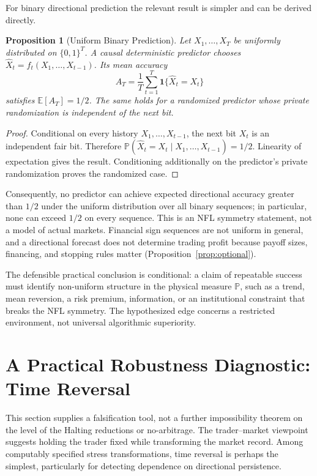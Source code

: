 \documentclass[aps,pra,reprint,superscriptaddress,amsmath,amssymb,floatfix]{revtex4-2}
\theoremstyle{plain}
\newtheorem{proposition}[theorem]{Proposition}
\theoremstyle{definition}
\theoremstyle{remark}
\begin{document}
For binary directional prediction the relevant result is simpler and can be
derived directly.

\begin{proposition}[Uniform Binary Prediction]
  \label{prop:binary}
  Let \(X_1,\ldots,X_T\) be uniformly distributed on \(\{0,1\}^T\). A causal
  deterministic predictor chooses
  \(\widehat X_t=f_t(X_1,\ldots,X_{t-1})\). Its mean accuracy
  \[
    A_T=\frac1T\sum_{t=1}^T
      \mathbf{1}\{\widehat X_t=X_t\}
  \]
  satisfies \(\mathbb{E}[A_T]=1/2\). The same holds for a randomized predictor
  whose private randomization is independent of the next bit.
\end{proposition}

\begin{proof}
Conditional on every history \(X_1,\ldots,X_{t-1}\), the next bit \(X_t\) is
an independent fair bit. Therefore
\(\mathbb{P}(\widehat X_t=X_t\mid X_1,\ldots,X_{t-1})=1/2\).
Linearity of expectation gives the result. Conditioning additionally on the
predictor's private randomization proves the randomized case.
\end{proof}

Consequently, no predictor can achieve expected directional accuracy greater
than \(1/2\) under the uniform distribution over all binary sequences; in
particular, none can exceed \(1/2\) on every sequence. This is an NFL symmetry
statement, not a model of actual markets. Financial sign sequences are not
uniform in general, and a directional forecast does not determine trading
profit because payoff sizes, financing, and stopping rules matter
(Proposition~\ref{prop:optional}).

The defensible practical conclusion is conditional: a claim of repeatable
success must identify non-uniform structure in the physical measure
\(\mathbb{P}\), such as a trend, mean reversion, a risk premium, information,
or an institutional constraint that breaks the NFL symmetry. The hypothesized
edge concerns a restricted environment, not universal algorithmic
superiority.

\section{A Practical Robustness Diagnostic: Time Reversal}
\label{sec:criterion}

This section supplies a falsification tool, not a further impossibility
theorem on the level of the Halting reductions or no-arbitrage. The
trader--market viewpoint suggests holding the trader fixed while transforming
the market record. Among computably specified stress transformations, time
reversal is perhaps the simplest, particularly for detecting dependence on
directional persistence.
\end{document}
